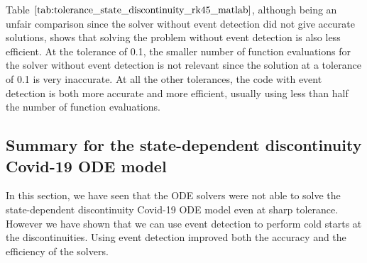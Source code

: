 Table $\ref{tab:tolerance_state_discontinuity_rk45_matlab}$, although being an unfair comparison since the solver without event detection did not give accurate solutions, shows that solving the problem without event detection is also less efficient. At the tolerance of 0.1, the smaller number of function evaluations for the solver without event detection is not relevant since the solution at a tolerance of 0.1 is very inaccurate. At all the other tolerances, the code with event detection is both more accurate and more efficient, usually using less than half the number of function evaluations.

\subsection{Summary for the state-dependent discontinuity Covid-19 ODE model}
In this section, we have seen that the ODE solvers were not able to solve the state-dependent discontinuity Covid-19 ODE model even at sharp tolerance. However we have shown that we can use event detection to perform cold starts at the discontinuities. Using event detection improved both the accuracy and the efficiency of the solvers.